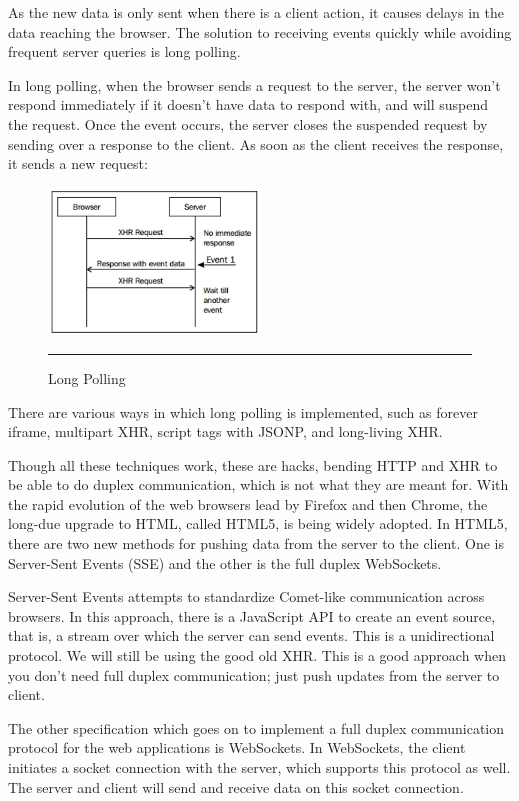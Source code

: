 As the new data is only sent when there is a client action, it causes delays in the
data reaching the browser. The solution to receiving events quickly while avoiding
frequent server queries is long polling.\cite{15}

In long polling, when the browser sends a request to the server, the server won't
respond immediately if it doesn't have data to respond with, and will suspend the
request. Once the event occurs, the server closes the suspended request by sending
over a response to the client. As soon as the client receives the response, it sends a
new request:
\begin{figure}[h!]
  \centering
    \includegraphics[width=0.5\textwidth]{./Pictures/long_poling.jpg}
  \rule{0.5\textwidth}{1pt}
  \caption{Long Polling}
\end{figure}
There are various ways in which long polling is implemented, such as forever iframe,
multipart XHR, script tags with JSONP, and long-living XHR.\cite{15}

Though all these techniques work, these are hacks, bending HTTP and XHR to be
able to do duplex communication, which is not what they are meant for.
With the rapid evolution of the web browsers lead by Firefox and then Chrome, the
long-due upgrade to HTML, called HTML5, is being widely adopted. In HTML5,
there are two new methods for pushing data from the server to the client. One is
Server-Sent Events (SSE) and the other is the full duplex WebSockets.\cite{15}

Server-Sent Events attempts to standardize Comet-like communication across
browsers. In this approach, there is a JavaScript API to create an event source, that is,
a stream over which the server can send events. This is a unidirectional protocol. We
will still be using the good old XHR. This is a good approach when you don't need
full duplex communication; just push updates from the server to client.\cite{15}

The other specification which goes on to implement a full duplex communication
protocol for the web applications is WebSockets. In WebSockets, the client initiates
a socket connection with the server, which supports this protocol as well. The server
and client will send and receive data on this socket connection.\cite{15}
